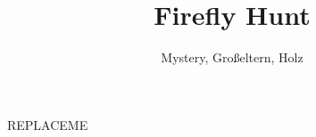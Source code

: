 \documentclass[10pt,a4paper]{scrartcl}
\author{Mystery, Großeltern, Holz}
\title{Firefly Hunt}
\date{}
\begin{document}
\maketitle



REPLACEME
\end{document}
